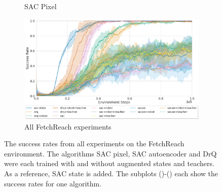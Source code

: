 \begin{figure}
\begin{subfigure}[b]{.32\textwidth}
        \caption{SAC Pixel}
        \label{fig:results:reach:sac}
    \end{subfigure}
    \hfill
    \begin{subfigure}[b]{.99\textwidth}
        \centering
    \includegraphics[width=\textwidth]{images/results/reach/all.png}
        \caption{All FetchReach experiments}
        \label{fig:results:reach:all}
    \end{subfigure}
    \caption[The success rates from all experiments on the FetchReach environment.]{The success rates from all experiments on the FetchReach environment. The algorithms SAC pixel, SAC autoencoder and DrQ were each trained with and without augmented states and teachers. As a reference, SAC state is added. The subplots ()-() each show the success rates for one algorithm.}
    \label{fig:results:reach}
\end{figure}

